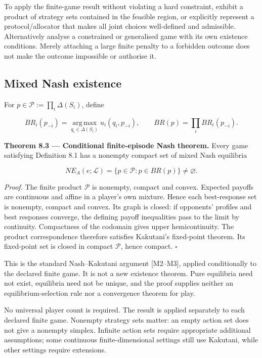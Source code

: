 \documentclass[11pt,a4paper]{article}
\begin{document}
To apply the finite-game result without violating a hard constraint,
exhibit a product of strategy sets contained in the feasible region, or
explicitly represent a protocol/allocator that makes all joint choices
well-defined and admissible. Alternatively analyse a constrained or
generalised game with its own existence conditions. Merely attaching a
large finite penalty to a forbidden outcome does not make the outcome
impossible or authorise it.

\subsection{Mixed Nash existence}\label{mixed-nash-existence}

For \(p\in\mathcal P:=\prod_i\Delta(S_i)\), define

\nopagebreak[4]

\[
BR_i(p_{-i})=
\operatorname*{arg\,max}_{q_i\in\Delta(S_i)}u_i(q_i,p_{-i}),
\qquad BR(p)=\prod_iBR_i(p_{-i}).
\]


\textbf{Theorem 8.3 --- Conditional finite-episode Nash theorem.} Every
game satisfying Definition 8.1 has a nonempty compact set of mixed Nash
equilibria

\nopagebreak[4]

\[NE_A(e;\mathcal L)=\{p\in\mathcal P:p\in BR(p)\}\neq\varnothing.\]

\emph{Proof.} The finite product \(\mathcal P\) is nonempty, compact and
convex. Expected payoffs are continuous and affine in a player's own
mixture. Hence each best-response set is nonempty, compact and convex.
Its graph is closed: if opponents' profiles and best responses converge,
the defining payoff inequalities pass to the limit by continuity.
Compactness of the codomain gives upper hemicontinuity. The product
correspondence therefore satisfies Kakutani's fixed-point theorem. Its
fixed-point set is closed in compact \(\mathcal P\), hence compact.
\(\square\)

This is the standard Nash--Kakutani argument {[}M2--M3{]}, applied
conditionally to the declared finite game. It is not a new existence
theorem. Pure equilibria need not exist, equilibria need not be unique,
and the proof supplies neither an equilibrium-selection rule nor a
convergence theorem for play.

No universal player count is required. The result is applied separately
to each declared finite game. Nonempty strategy sets matter: an empty
action set does not give a nonempty simplex. Infinite action sets
require appropriate additional assumptions; some continuous
finite-dimensional settings still use Kakutani, while other settings
require extensions.
\end{document}
